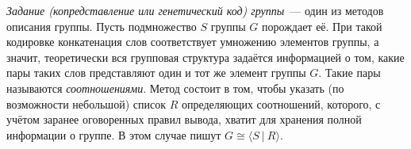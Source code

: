         \begin{definition}
            \textit{Задание (копредставление или генетический код) группы}~--- один из методов описания группы.
             Пусть подмножество $S$ группы $G$ порождает её. При такой кодировке конкатенация слов соответствует умножению элементов группы, а значит, теоретически вся групповая структура задаётся информацией о том, какие пары таких слов представляют один и тот же элемент группы $G$. Такие пары называются \textit{соотношениями}.  Метод состоит в том, чтобы указать (по возможности небольшой) список $R$ определяющих соотношений, которого, с учётом заранее оговоренных правил вывода, хватит для хранения полной информации о группе. В этом случае пишут ${G \cong \langle S \ | \ R \rangle.}$
        \end{definition}